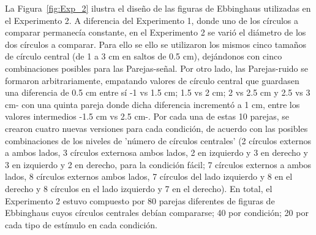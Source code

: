 \begin{itemize}
La Figura~\ref{fig:Exp_2} ilustra el diseño de las figuras de Ebbinghaus utilizadas en el Experimento 2. A diferencia del Experimento 1, donde uno de los círculos a comparar permanecía constante, en el Experimento 2 se varió el diámetro de los dos círculos a comparar. Para ello se ello se utilizaron los mismos cinco tamaños de círculo central (de 1 a 3 cm en saltos de 0.5 cm), dejándonos con cinco combinaciones posibles para las Parejas-señal. Por otro lado, las Parejas-ruido se formaron arbitrariamente, empatando valores de círculo central que guardasen una diferencia de 0.5 cm entre sí -1 vs 1.5 cm; 1.5 vs 2 cm; 2 vs 2.5 cm y 2.5 vs 3 cm- con una quinta pareja donde dicha diferencia incrementó a 1 cm, entre los valores intermedios -1.5 cm vs 2.5 cm-. Por cada una de estas 10 parejas, se crearon cuatro nuevas versiones para cada condición, de acuerdo con las posibles combinaciones de los niveles de 'número de círculos centrales' (2 círculos externos a ambos lados, 3 círculos externosa ambos lados, 2 en izquierdo y 3 en derecho y 3 en izquierdo y 2 en derecho, para la condición fácil; 7 círculos externos a ambos lados, 8 círculos externos ambos lados, 7 círculos del lado izquierdo y 8 en el derecho y 8 círculos en el lado izquierdo y 7 en el derecho). En total, el Experimento 2 estuvo compuesto por 80 parejas diferentes de figuras de Ebbinghaus cuyos círculos centrales debían compararse; 40 por condición; 20 por cada tipo de estímulo en cada condición.\\


\end{itemize}
